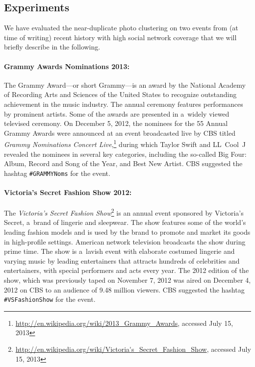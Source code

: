 \subsection{Experiments}

We have evaluated the near-duplicate photo clustering
on two events from (at time of writing) recent history with high social network coverage
that we will briefly describe in the following.

\paragraph{Grammy Awards Nominations 2013:}

The Grammy Award---or short Grammy---is an award by
the National Academy of Recording Arts and Sciences of the United States
to recognize outstanding achievement in the music industry.
The annual ceremony features performances by prominent artists.
Some of the awards are presented in a~widely viewed televised ceremony.
On December 5, 2012, the nominees for the 55 Annual Grammy Awards
were announced at an event broadcasted live by CBS
titled \emph{Grammy Nominations Concert
Live},\footnote{\url{http://en.wikipedia.org/wiki/2013_Grammy_Awards},
accessed July 15, 2013}
during which Taylor Swift and LL~Cool~J revealed the nominees
in several key categories, including the so-called Big Four:
Album, Record and Song of the Year, and Best New Artist.
CBS suggested the hashtag \texttt{\#GRAMMYNoms} for the event.

\paragraph{Victoria's Secret Fashion Show 2012:}
\label{sec:vsfashionshow}

The \emph{Victoria's Secret Fashion
Show}\footnote{\url{http://en.wikipedia.org/wiki/Victoria's_Secret_Fashion_Show},
accessed July 15, 2013} is an annual event
sponsored by Victoria's Secret, a~brand of lingerie and sleepwear.
The show features some of the world's leading fashion models
and is used by the brand to promote and market its goods in high-profile settings.
American network television broadcasts the show during prime time.
The show is a~lavish event with elaborate costumed lingerie and
varying music by leading entertainers
that attracts hundreds of celebrities and entertainers,
with special performers and acts every year.
The 2012 edition of the show,
which was previously taped on November 7, 2012
was aired on December 4, 2012 on CBS
to an audience of 9.48 million viewers.
CBS suggested the hashtag \texttt{\#VSFashionShow} for the event.

